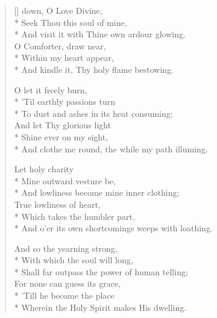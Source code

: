
\newHymn
{}
\settowidth{\versewidth}{Come down o love divine and help me}
\begin{verse}[\versewidth]
 down, O Love Divine,\\*
Seek Thou this soul of mine,\\*
\hspace*{-\vgap} And visit it with Thine own ardour glowing.\\
O Comforter, draw near,\\*
Within my heart appear,\\*
\hspace*{-\vgap} And kindle it, Thy holy flame bestowing.

O let it freely burn,\\*
'Til earthly passions turn\\*
\hspace*{-\vgap} To dust and ashes in its heat consuming;\\
And let Thy glorious light\\*
Shine ever on my sight,\\*
\hspace*{-\vgap} And clothe me round, the while my path illuming.

Let holy charity\\*
Mine outward vesture be,\\*
\hspace*{-\vgap} And lowliness become mine inner clothing;\\
True lowliness of heart,\\*
Which takes the humbler part,\\*
\hspace*{-\vgap} And o’er its own shortcomings weeps with loathing.

And so the yearning strong,\\*
With which the soul will long,\\*
\hspace*{-\vgap} Shall far outpass the power of human telling;\\
For none can guess its grace,\\*
'Till he become the place\\*
\hspace*{-\vgap} Wherein the Holy Spirit makes His dwelling.
\end{verse}


